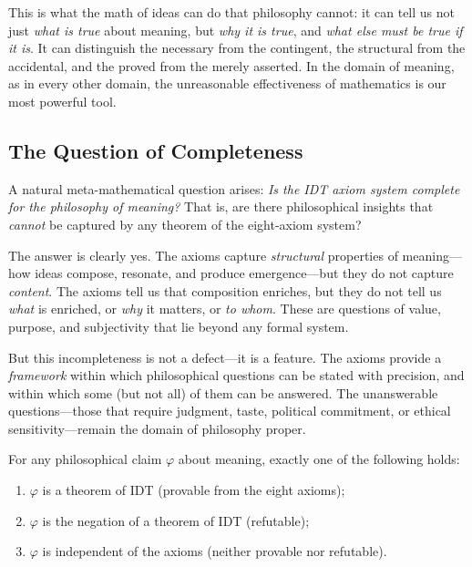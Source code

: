 This is what the math of ideas can do that philosophy cannot: it can tell us
not just \emph{what is true} about meaning, but \emph{why it is true}, and
\emph{what else must be true if it is}. It can distinguish the necessary from
the contingent, the structural from the accidental, and the proved from the
merely asserted. In the domain of meaning, as in every other domain, the
unreasonable effectiveness of mathematics is our most powerful tool.

\subsection{The Question of Completeness}

A natural meta-mathematical question arises: \emph{Is the IDT axiom system
complete for the philosophy of meaning?} That is, are there philosophical
insights that \emph{cannot} be captured by any theorem of the eight-axiom
system?

The answer is clearly yes. The axioms capture \emph{structural} properties
of meaning---how ideas compose, resonate, and produce emergence---but they
do not capture \emph{content}. The axioms tell us that composition enriches,
but they do not tell us \emph{what} is enriched, or \emph{why} it matters,
or \emph{to whom}. These are questions of value, purpose, and subjectivity
that lie beyond any formal system.

But this incompleteness is not a defect---it is a feature. The axioms
provide a \emph{framework} within which philosophical questions can be
stated with precision, and within which some (but not all) of them can be
answered. The unanswerable questions---those that require judgment, taste,
political commitment, or ethical sensitivity---remain the domain of
philosophy proper.

\begin{theorem}
\label{thm:formal-philosophical-complementarity}
For any philosophical claim $\varphi$ about meaning, exactly one of the
following holds:
\begin{enumerate}
\item $\varphi$ is a theorem of IDT (provable from the eight axioms);
\item $\varphi$ is the negation of a theorem of IDT (refutable);
\item $\varphi$ is independent of the axioms (neither provable nor refutable).
\end{enumerate}
\end{theorem}

